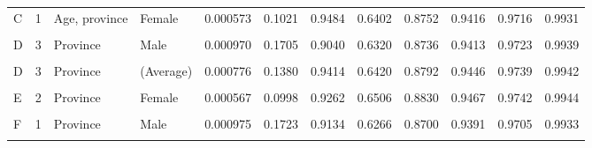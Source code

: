 \documentclass[
]{report}
\begin{document}
\begin{table}[!h]
\begin{tabular}[t]{llllrrrrrrrr}
C & 1 & Age, province & Female & 0.000573 & 0.1021 & 0.9484 & 0.6402 & 0.8752 & 0.9416 & 0.9716 & 0.9931\\
\cellcolor{gray!6}{C} & \cellcolor{gray!6}{1} & \cellcolor{gray!6}{Age, province} & \cellcolor{gray!6}{(Average)} & \cellcolor{gray!6}{0.000773} & \cellcolor{gray!6}{0.1368} & \cellcolor{gray!6}{0.9288} & \cellcolor{gray!6}{0.6299} & \cellcolor{gray!6}{0.8705} & \cellcolor{gray!6}{0.9393} & \cellcolor{gray!6}{0.9705} & \cellcolor{gray!6}{0.9931}\\
D & 3 & Province & Male & 0.000970 & 0.1705 & 0.9040 & 0.6320 & 0.8736 & 0.9413 & 0.9723 & 0.9939\\
\addlinespace
\cellcolor{gray!6}{D} & \cellcolor{gray!6}{3} & \cellcolor{gray!6}{Province} & \cellcolor{gray!6}{Female} & \cellcolor{gray!6}{0.000582} & \cellcolor{gray!6}{0.1054} & \cellcolor{gray!6}{0.9787} & \cellcolor{gray!6}{0.6521} & \cellcolor{gray!6}{0.8848} & \cellcolor{gray!6}{0.9479} & \cellcolor{gray!6}{0.9755} & \cellcolor{gray!6}{0.9946}\\
D & 3 & Province & (Average) & 0.000776 & 0.1380 & 0.9414 & 0.6420 & 0.8792 & 0.9446 & 0.9739 & 0.9942\\
\cellcolor{gray!6}{E} & \cellcolor{gray!6}{2} & \cellcolor{gray!6}{Province} & \cellcolor{gray!6}{Male} & \cellcolor{gray!6}{0.000965} & \cellcolor{gray!6}{0.1688} & \cellcolor{gray!6}{0.8946} & \cellcolor{gray!6}{0.6269} & \cellcolor{gray!6}{0.8708} & \cellcolor{gray!6}{0.9404} & \cellcolor{gray!6}{0.9709} & \cellcolor{gray!6}{0.9936}\\
E & 2 & Province & Female & 0.000567 & 0.0998 & 0.9262 & 0.6506 & 0.8830 & 0.9467 & 0.9742 & 0.9944\\
\cellcolor{gray!6}{E} & \cellcolor{gray!6}{2} & \cellcolor{gray!6}{Province} & \cellcolor{gray!6}{(Average)} & \cellcolor{gray!6}{0.000766} & \cellcolor{gray!6}{0.1343} & \cellcolor{gray!6}{0.9104} & \cellcolor{gray!6}{0.6388} & \cellcolor{gray!6}{0.8769} & \cellcolor{gray!6}{0.9436} & \cellcolor{gray!6}{0.9725} & \cellcolor{gray!6}{0.9940}\\
\addlinespace
F & 1 & Province & Male & 0.000975 & 0.1723 & 0.9134 & 0.6266 & 0.8700 & 0.9391 & 0.9705 & 0.9933\\
\cellcolor{gray!6}{F} & \cellcolor{gray!6}{1} & \cellcolor{gray!6}{Province} & \cellcolor{gray!6}{Female} & \cellcolor{gray!6}{0.000602} & \cellcolor{gray!6}{0.1127} & \cellcolor{gray!6}{1.0465} & \cellcolor{gray!6}{0.6492} & \cellcolor{gray!6}{0.8815} & \cellcolor{gray!6}{0.9451} & \cellcolor{gray!6}{0.9740} & \cellcolor{gray!6}{0.9939}\\

\end{tabular}
\end{table}
\end{document}
